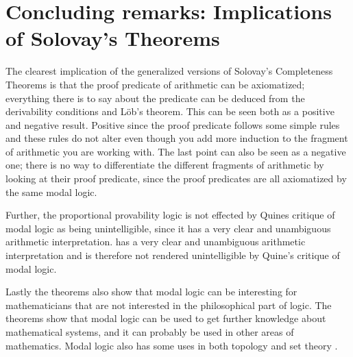 \documentclass[../main.tex]{subfiles}
\begin{document}
\section{Concluding remarks: Implications of Solovay's Theorems}

The clearest implication of the generalized versions of Solovay's Completeness
Theorems is that the proof predicate of arithmetic can be axiomatized;
everything there is to say about the predicate can be deduced from the
derivability conditions and Löb's theorem. This can be seen both as a positive
and negative result. Positive since the proof predicate follows some simple
rules and these rules  do not alter even though you add more induction to the
fragment of arithmetic you are working with. The last point can also be seen
as a negative one; there is no way to differentiate the different fragments of
arithmetic by looking at their proof predicate, since the proof predicates are
all axiomatized by the same modal logic.

Further, the proportional provability logic is not effected by Quines critique of
modal logic as being unintelligible, since it has a very clear and unambiguous
arithmetic interpretation. has a very clear and unambiguous arithmetic interpretation and is therefore not rendered unintelligible by Quine's critique of modal logic.

Lastly the theorems also show that modal logic can be interesting for
mathematicians that are not interested in the philosophical part of logic. The
theorems show that modal logic can be used to get further knowledge about
mathematical systems, and it can probably be used in other areas of mathematics.
Modal logic also has some uses in both topology and set theory
\citet{Artemov2007}.
\end{document}
